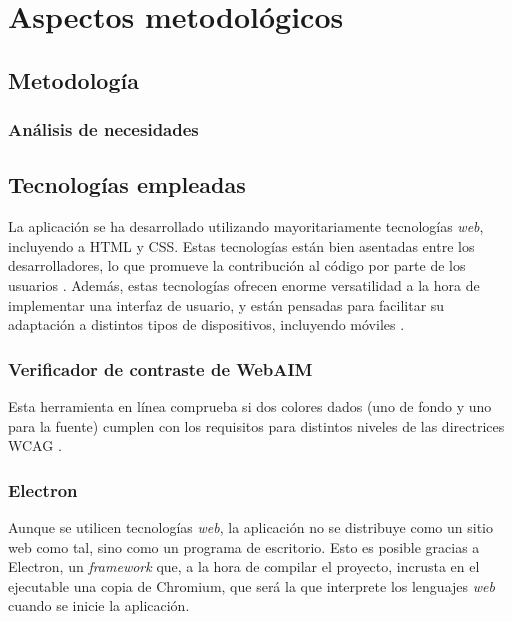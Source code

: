 \chapter{Aspectos metodológicos}  

\section{Metodología}

\subsection{Análisis de necesidades}

\todo

\section{Tecnologías empleadas}

La aplicación se ha desarrollado utilizando mayoritariamente tecnologías \textit{web}, incluyendo a HTML y CSS. Estas tecnologías están bien asentadas entre los desarrolladores, lo que promueve la contribución al código por parte de los usuarios \autocite{7887704}. Además, estas tecnologías ofrecen enorme versatilidad a la hora de implementar una interfaz de usuario, y están pensadas para facilitar su adaptación a distintos tipos de dispositivos, incluyendo móviles \citationNeeded.

\subsection{Verificador de contraste de WebAIM}

Esta herramienta \autocite{WebAIM} en línea comprueba si dos colores dados (uno de fondo y uno para la fuente) cumplen con los requisitos para distintos niveles de las directrices WCAG \autocite{wcag}.

\subsection{Electron}

Aunque se utilicen tecnologías \textit{web}, la aplicación no se distribuye como un sitio web como tal, sino como un programa de escritorio. Esto es posible gracias a Electron, un \textit{framework} que, a la hora de compilar el proyecto, incrusta en el ejecutable una copia de Chromium, que será la que interprete los lenguajes \textit{web} cuando se inicie la aplicación. \autocite{Electron}

